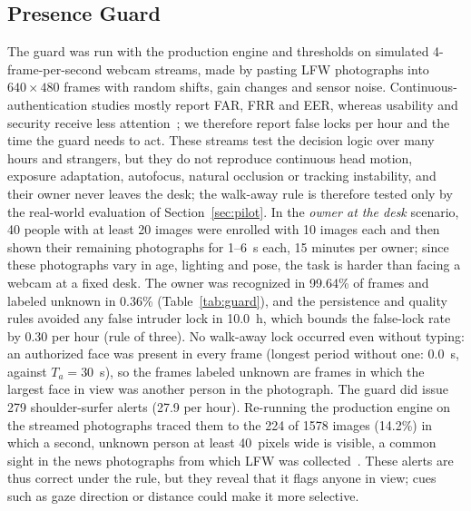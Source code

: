 \documentclass{ieeeaccess}
\begin{document}
\subsection{Presence Guard}\label{sec:guardres}
The guard was run with the production engine and thresholds on simulated 4-frame-per-second webcam streams, made by pasting LFW photographs into $640\times480$ frames with random shifts, gain changes and sensor noise. Continuous-authentication studies mostly report FAR, FRR and EER, whereas usability and security receive less attention~\cite{ayeswarya2024review}; we therefore report false locks per hour and the time the guard needs to act. These streams test the decision logic over many hours and strangers, but they do not reproduce continuous head motion, exposure adaptation, autofocus, natural occlusion or tracking instability, and their owner never leaves the desk; the walk-away rule is therefore tested only by the real-world evaluation of Section~\ref{sec:pilot}. In the \emph{owner at the desk} scenario, 40 people with at least 20 images were enrolled with 10 images each and then shown their remaining photographs for 1--6~s each, 15 minutes per owner; since these photographs vary in age, lighting and pose, the task is harder than facing a webcam at a fixed desk. The owner was recognized in 99.64\% of frames and labeled unknown in 0.36\% (Table~\ref{tab:guard}), and the persistence and quality rules avoided any false intruder lock in 10.0~h, which bounds the false-lock rate by 0.30 per hour (rule of three). No walk-away lock occurred even without typing: an authorized face was present in every frame (longest period without one: 0.0~s, against $T_a=30$~s), so the frames labeled unknown are frames in which the largest face in view was another person in the photograph. The guard did issue 279 shoulder-surfer alerts (27.9 per hour). Re-running the production engine on the streamed photographs traced them to the 224 of 1578 images (14.2\%) in which a second, unknown person at least 40~pixels wide is visible, a common sight in the news photographs from which LFW was collected~\cite{huang2007lfw}. These alerts are thus correct under the rule, but they reveal that it flags anyone in view; cues such as gaze direction or distance could make it more selective.
\end{document}
